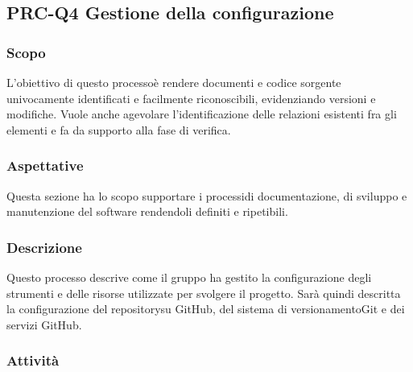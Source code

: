 \subsection{PRC-Q4 Gestione della configurazione}
	\subsubsection{Scopo}
		L'obiettivo di questo processo\glosp è rendere documenti e codice sorgente univocamente identificati e facilmente riconoscibili, evidenziando versioni e modifiche. Vuole anche agevolare l'identificazione delle relazioni esistenti fra gli elementi e fa da supporto alla fase di verifica.
	\subsubsection{Aspettative}
		Questa sezione ha lo scopo supportare i processi\glosp di documentazione, di sviluppo e manutenzione del software rendendoli definiti e ripetibili.  
	\subsubsection{Descrizione} 
		Questo processo descrive come il gruppo ha gestito la configurazione degli strumenti e delle risorse utilizzate per svolgere il progetto\glo.
		Sarà quindi descritta la configurazione del repository\glosp su GitHub, del sistema di versionamento\glosp Git e dei servizi GitHub.
	\subsubsection{Attività}
